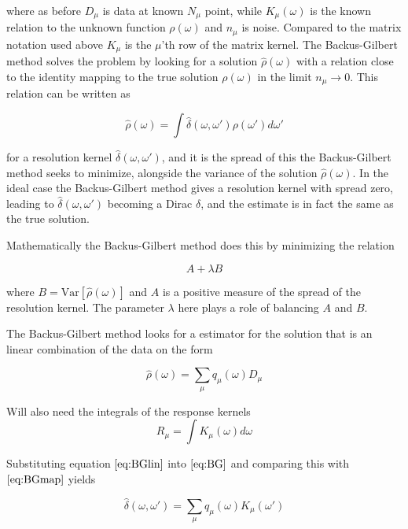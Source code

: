 \documentclass[a4paper, oneside, 12pt]{book}
\begin{document}
where as before $D_{\mu}$ is data at known $N_{\mu}$ point, while $K_{\mu}(\omega)$ is the known relation to the unknown function $\rho(\omega)$ and $n_{\mu}$ is noise. Compared to the matrix notation used above $K_{\mu}$ is the $\mu$'th row of the matrix kernel. The Backus-Gilbert method solves the problem by looking for a solution $\hat{\rho}(\omega)$ with a relation close to the identity mapping to the true solution $\rho(\omega)$ in the limit $n_{\mu} \rightarrow 0$. This relation can be written as

\begin{equation}
\label{eq:BGmap}
\hat{\rho}(\omega) = \int \hat{\delta}(\omega,\omega')\rho(\omega')d\omega'
\end{equation}

for a resolution kernel $\hat{\delta}(\omega,\omega')$, and it is the spread of this the Backus-Gilbert method seeks to minimize, alongside the variance of the solution $\hat{\rho}(\omega)$. In the ideal case the Backus-Gilbert method gives a resolution kernel with spread zero, leading to $\hat{\delta}(\omega,\omega')$ becoming a Dirac $\delta$, and the estimate is in fact the same as the true solution. 

Mathematically the Backus-Gilbert method does this by minimizing the relation 

\begin{equation}
A + \lambda B
\end{equation}

where $B=\mathrm{Var}[\hat{\rho}(\omega)]$ and $A$ is a positive measure of the spread of the resolution kernel. The parameter $\lambda$ here plays a role of balancing $A$ and $B$.

The Backus-Gilbert method looks for a estimator for the solution that is an linear combination of the data on the form

\begin{equation}
\label{eq:BGlin}
\hat{\rho}(\omega) = \sum_{\mu}q_{\mu}(\omega)D_{\mu}
\end{equation}

Will also need the integrals of the response kernels
\begin{equation}
R_{\mu}=\int K_{\mu}(\omega)d\omega
\end{equation}

Substituting equation $\ref{eq:BGlin}$ into $\ref{eq:BG}$ and comparing this with $\ref{eq:BGmap}$ yields

\begin{equation}
\hat{\delta}(\omega,\omega')=\sum_{\mu}q_{\mu}(\omega)K_{\mu}(\omega')
\end{equation}
\end{document}
